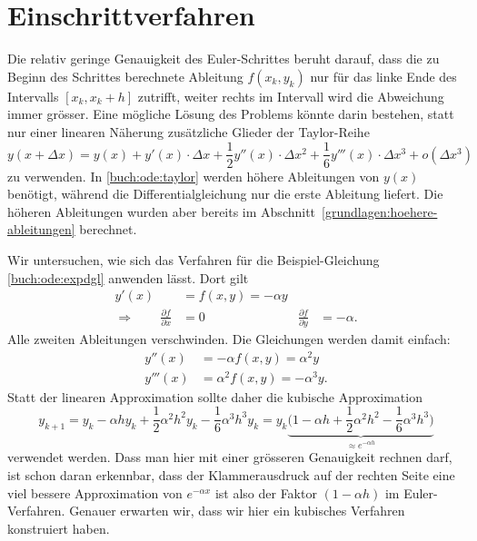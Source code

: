 %
%
%
\section{Einschrittverfahren\label{buch:section:ode:einschritt}}
%
Die relativ geringe Genauigkeit des Euler-Schrittes beruht darauf,
dass die zu Beginn des Schrittes berechnete Ableitung $f(x_k,y_k)$
nur für das linke Ende des Intervalls $[x_k, x_k+h]$ zutrifft,
weiter rechts im Intervall wird die Abweichung immer grösser.
Eine mögliche Lösung des Problems könnte darin bestehen, statt
nur einer linearen Näherung zusätzliche Glieder der Taylor-Reihe
\begin{equation}
y(x+\Delta x)
=
y(x)
+
y'(x)\cdot \Delta x
+
\frac12 y''(x)\cdot \Delta x^2
+
\frac16 y'''(x)\cdot \Delta x^3
+
o(\Delta x^3)
\label{buch:ode:taylor}
\end{equation}
zu verwenden.
In \eqref{buch:ode:taylor} werden höhere Ableitungen von $y(x)$ benötigt,
während die Differentialgleichung nur die erste Ableitung liefert.
Die höheren Ableitungen wurden aber bereits im
Abschnitt~\ref{grundlagen:hoehere-ableitungen} berechnet.

Wir untersuchen, wie sich das Verfahren für die Beispiel-Gleichung
\eqref{buch:ode:expdgl} anwenden lässt.
Dort gilt
\begin{equation*}
\begin{aligned}
y'(x)&=f(x,y)=-\alpha y
\\
\Rightarrow\qquad
\frac{\partial f}{\partial x}&=0&\frac{\partial f}{\partial y}&=-\alpha.
\end{aligned}
\end{equation*}
Alle zweiten Ableitungen verschwinden.
Die Gleichungen werden damit einfach:
\begin{align*}
y''(x)&=-\alpha f(x,y)=\alpha^2 y
\\
y'''(x)&=\alpha^2f(x,y)=-\alpha^3 y.
\end{align*}
Statt der linearen Approximation sollte daher die kubische Approximation
\begin{equation}
y_{k+1}
=
y_{k}-\alpha h y_k +\frac12\alpha^2 h^2 y_k -\frac16 \alpha^3h^3 y_k
=
y_{k}\underbrace{\biggl(1-\alpha h +\frac12\alpha^2h^2 -\frac16 \alpha^3h^3\biggr)}_{\displaystyle \approx e^{-\alpha h}}
\label{buch:ode:kubisch}
\end{equation}
verwendet werden.
Dass man hier mit einer grösseren Genauigkeit rechnen darf, ist schon daran
erkennbar, dass der Klammerausdruck auf der rechten Seite eine viel
bessere Approximation von $e^{-\alpha x}$ ist also der Faktor
$(1-\alpha h)$ im Euler-Verfahren.
Genauer erwarten wir, dass wir hier ein kubisches Verfahren konstruiert haben.

